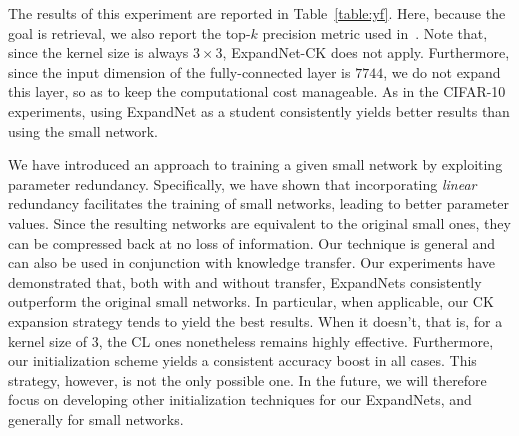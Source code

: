 \documentclass[10pt,twocolumn,letterpaper]{article}
\begin{document}
The results of this experiment are reported in Table~\ref{table:yf}. Here, because the goal is retrieval, we also report the top-$k$ precision metric used in~\cite{pkt_eccv}.  Note that, since the kernel size is always $3\times 3$, ExpandNet-CK does not apply. Furthermore, since the input dimension of the fully-connected layer is $7744$, we do not expand this layer, so as to keep the computational cost manageable. As in the CIFAR-10 experiments, using ExpandNet as a student consistently yields better results than using the small network.


We have introduced an approach to training a given small network by exploiting parameter redundancy. Specifically, we have shown that incorporating {\it linear} redundancy facilitates the training of small networks, leading to better parameter values. Since the resulting networks are equivalent to the original small ones, they can be compressed back at no loss of information. Our technique is general and can also be used in conjunction with knowledge transfer. Our experiments have demonstrated that, both with and without transfer, ExpandNets consistently outperform the original small networks. In particular, when applicable, our CK expansion strategy tends to yield the best results. When it doesn't, that is, for a kernel size of 3, the CL ones nonetheless remains highly effective. Furthermore, our initialization scheme yields a consistent accuracy boost in all cases. This strategy, however, is not the only possible one.
In the future, we will therefore focus on developing other initialization techniques for our ExpandNets, and generally for small networks.
\thispagestyle{empty}



{\small
%
%

}
\end{document}
